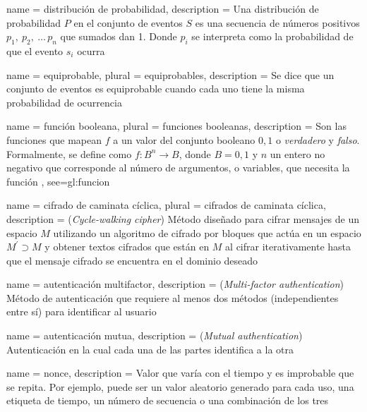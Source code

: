 {
  name = distribución de probabilidad,
  description = {
    Una distribución de probabilidad $P$ en el conjunto de eventos $S$ es
    una secuencia de números positivos $p_1,\: p_2,\: \dots\, p_n$ que
    sumados dan 1. Donde $p_i$ se interpreta como la probabilidad de
    que el evento $s_i$ ocurra%
  }
}

{
  name = equiprobable,
  plural = equiprobables,
  description = {
    Se dice que un conjunto de eventos es equiprobable cuando cada uno tiene
    la misma probabilidad de ocurrencia%
  }
}

{
  name = función booleana,
  plural = funciones booleanas,
  description = {
    Son las funciones que mapean $f$ a un valor del conjunto booleano ${0,1}$ o
    \textit{verdadero} y \textit{falso}.
    Formalmente, se define como $f: B^n \rightarrow B$, donde $B={0,1}$
    y $n$ un entero no negativo que corresponde al número de argumentos,
    o variables, que necesita la función%
  },
  see={gl:funcion}
}

{
  name = cifrado de caminata cíclica,
  plural = cifrados de caminata cíclica,
  description = {
    (\textit{Cycle-walking cipher}) Método diseñado para cifrar mensajes de un
    espacio $M$ utilizando un algoritmo de cifrado por bloques que actúa en un
    espacio $M^\prime \supset M$ y obtener textos cifrados que están en $M$ al
    cifrar iterativamente hasta que el mensaje cifrado se encuentra en el
    dominio deseado%
  }
}

{
  name = autenticación multifactor,
  description = {
    (\textit{Multi-factor authentication}) Método de autenticación que requiere
    al menos dos métodos (independientes entre sí) para identificar al usuario%
  }
}

{
  name = autenticación mutua,
  description = {
    (\textit{Mutual authentication}) Autenticación en la cual cada una de
    las partes identifica a la otra%
  }
}

{
  name = nonce,
  description = {
    Valor que varía con el tiempo y es improbable que se repita. Por ejemplo,
    puede ser un valor aleatorio generado para cada uso, una etiqueta de tiempo,
    un número de secuencia o una combinación de los tres%
  }
}

